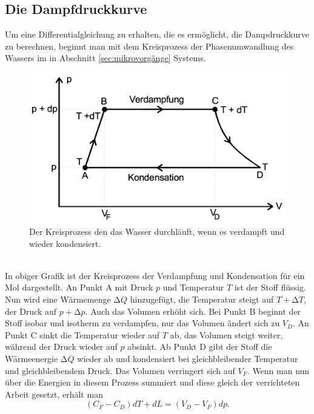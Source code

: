   \subsection{Die Dampfdruckkurve}
  \label{sec:dampfdruckkurve}
    Um eine Differentialgleichung zu erhalten, die es ermöglicht, die Dampdruckkurve zu berechnen, beginnt man mit dem
    Kreisprozess der Phasenumwandlung des Wassers im in Abschnitt \ref{sec:mikrovorgänge} Systems.
    \\
    \begin{figure}
      \centering
        \label{fig:kreisprozess}
          \includegraphics[scale=0.2]{Content/kreisprozess.png}
          \caption{Der Kreisprozess den das Wasser durchläuft, wenn es verdampft und wieder kondensiert.}
    \end{figure}
    \\
    \noindent
    In obiger Grafik ist der Kreisprozess der Verdampfung und Kondensation für ein Mol dargestellt. An Punkt A mit Druck $p$ und
    Temperatur $T$ ist der Stoff flüssig. Nun wird eine Wärmemenge $\increment Q$ hinzugefügt, die Temperatur steigt auf
    $T + \increment T$, der Druck auf $p + \increment p$. Auch das Volumen erhöht sich. Bei Punkt B beginnt der Stoff isobar
    und isotherm zu verdampfen, nur das Volumen ändert sich zu $V_{D}$. An Punkt C sinkt die Temperatur wieder auf $T$ ab, das
    Volumen steigt weiter, während der Druck wieder auf $p$ absinkt. Ab Punkt D gibt der Stoff die Wärmeenergie $\increment Q$
    wieder ab und kondensiert bei gleichbleibender Temperatur und gleichbleibendem Druck. Das Volumen verringert sich auf
    $V_{F}$.
    Wenn man nun über die Energien in diesem Prozess summiert und diese gleich der verrichteten Arbeit gesetzt, erhält man
    \begin{equation*}
      \label{eqn:wärmeenergiearbeit}
      (C_{F} - C_{D})dT + dL = (V_{D} - V_{F})dp.
    \end{equation*}
